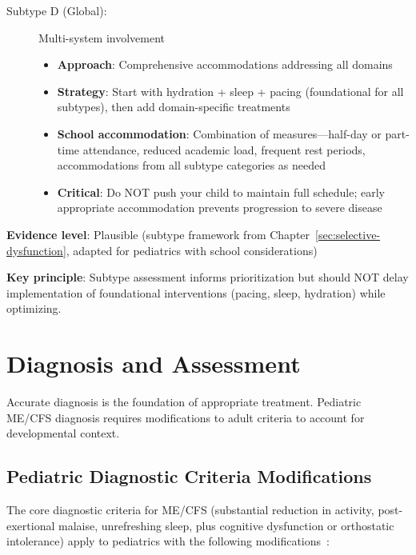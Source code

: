 \begin{recommendation}
\begin{description}
    \item[Subtype D (Global):] Multi-system involvement
    \begin{itemize}
        \item \textbf{Approach}: Comprehensive accommodations addressing all domains
        \item \textbf{Strategy}: Start with hydration + sleep + pacing (foundational for all subtypes), then add domain-specific treatments
        \item \textbf{School accommodation}: Combination of measures—half-day or part-time attendance, reduced academic load, frequent rest periods, accommodations from all subtype categories as needed
        \item \textbf{Critical}: Do NOT push your child to maintain full schedule; early appropriate accommodation prevents progression to severe disease
    \end{itemize}
\end{description}

\textbf{Evidence level}: Plausible (subtype framework from Chapter~\ref{sec:selective-dysfunction}, adapted for pediatrics with school considerations)

\textbf{Key principle}: Subtype assessment informs prioritization but should NOT delay implementation of foundational interventions (pacing, sleep, hydration) while optimizing.

\end{recommendation}

\section{Diagnosis and Assessment}
\label{sec:ped-diagnosis}

Accurate diagnosis is the foundation of appropriate treatment. Pediatric ME/CFS diagnosis requires modifications to adult criteria to account for developmental context.

\subsection{Pediatric Diagnostic Criteria Modifications}
\label{subsec:ped-diagnostic-criteria}

The core diagnostic criteria for ME/CFS (substantial reduction in activity, post-exertional malaise, unrefreshing sleep, plus cognitive dysfunction or orthostatic intolerance) apply to pediatrics with the following modifications~\cite{Rowe2017pediatric}:

